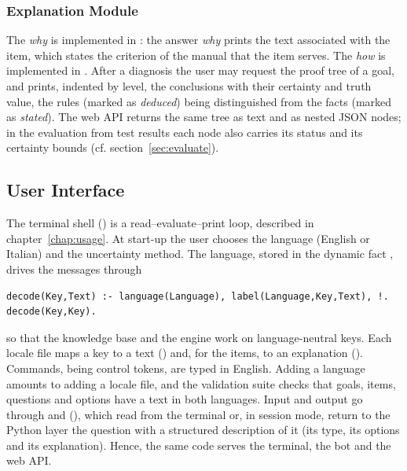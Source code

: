 \subsubsection{Explanation Module}

The \emph{why} is implemented in : the answer \emph{why} prints the
text  associated with the item, which states the criterion
of the manual that the item serves. The \emph{how} is implemented in
. After a diagnosis the user may request the proof tree of
a goal, and  prints, indented by level, the conclusions with
their certainty and truth value, the rules (marked as \emph{deduced}) being
distinguished from the facts (marked as \emph{stated}). The web API returns the
same tree as text and as nested JSON nodes; in the evaluation from test results
each node also carries its status and its certainty bounds (cf.
section~\ref{sec:evaluate}).

\subsection{User Interface}

The terminal shell () is a read--evaluate--print loop, described
in chapter~\ref{chap:usage}. At start-up the user chooses the language
(English or Italian) and the uncertainty method. The language, stored in the
dynamic fact , drives the messages through
\begin{lstlisting}
decode(Key,Text) :- language(Language), label(Language,Key,Text), !.
decode(Key,Key).
\end{lstlisting}
so that the knowledge base and the engine work on language-neutral keys. Each
locale file maps a key to a text () and, for the items, to an
explanation (). Commands, being control tokens, are typed in English. Adding a language amounts to adding a locale file, and
the validation suite checks that goals, items, questions and options have a
text in both languages. Input and output go through  and
 (), which read from the terminal or, in
session mode, return to the Python layer the question with a structured
description of it (its type, its options and its explanation). Hence, the same
code serves the terminal, the bot and the web API.
